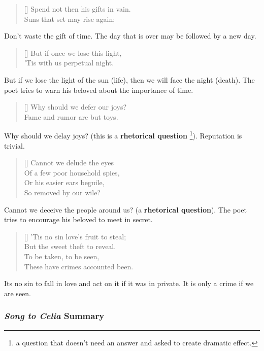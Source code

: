 \documentclass[12pt, a4paper]{article}
\newcommand{\attrib}[1]{\nopagebreak{\raggedleft\footnotesize #1\par}}
\begin{document}
\begin{verse}[\versewidth]
{\fontverse
Spend not then his gifts in vain.\\
Suns that set may rise again;
}
\end{verse}

Don't waste the gift of time. The day that is over 
may be followed by a new day.

\begin{verse}[\versewidth]
{\fontverse
But if once we lose this light,\\
'Tis with us perpetual night.
}
\end{verse}

But if we lose the light of the sun (life), then 
we will face the night (death). The poet tries to warn 
his beloved about the importance of time.


\begin{verse}[\versewidth]
{\fontverse
Why should we defer our joys?\\
Fame and rumor are but toys.
}
\end{verse}

Why should we delay joys? (this is a \textbf{rhetorical question}
\footnote{a question that doesn't need an answer and asked to create dramatic effect.}).
Reputation is trivial. 

\begin{verse}[\versewidth]
{\fontverse
Cannot we delude the eyes\\
Of a few poor household spies,\\
Or his easier ears beguile,\\
So removed by our wile?
}
\end{verse}

Cannot we deceive the people around us? (a \textbf{rhetorical question}).
The poet tries to encourage his beloved to meet in secret.

\begin{verse}[\versewidth]
{\fontverse
'Tis no sin love's fruit to steal;\\
But the sweet theft to reveal.\\
To be taken, to be seen,\\
These have crimes accounted been.
}
\end{verse}

Its no sin to fall in love and act on it if it was in 
private. It is only a crime if we are seen.

\attrib{From \textbf{Volpone}, 1605}


\subsubsection*{\textit{Song to Celia} Summary}
\end{document}
